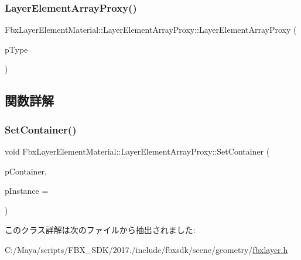 \subsubsection{\texorpdfstring{Layer\+Element\+Array\+Proxy()}{LayerElementArrayProxy()}}
{\footnotesize\ttfamily Fbx\+Layer\+Element\+Material\+::\+Layer\+Element\+Array\+Proxy\+::\+Layer\+Element\+Array\+Proxy (\begin{DoxyParamCaption}\item[{\hyperlink{fbxpropertytypes_8h_a73913a5ddfb20e57c6f25e9e6784bd92}{E\+Fbx\+Type}}]{p\+Type }\end{DoxyParamCaption})}



\subsection{関数詳解}
\mbox{\label{class_fbx_layer_element_material_1_1_layer_element_array_proxy_a8772c8cf8d76dbdcb5d4019ef29d6af0}} 
\subsubsection{\texorpdfstring{Set\+Container()}{SetContainer()}}
{\footnotesize\ttfamily void Fbx\+Layer\+Element\+Material\+::\+Layer\+Element\+Array\+Proxy\+::\+Set\+Container (\begin{DoxyParamCaption}\item[{\hyperlink{class_fbx_layer_container}{Fbx\+Layer\+Container} $\ast$}]{p\+Container,  }\item[{int}]{p\+Instance = {} }\end{DoxyParamCaption})}



このクラス詳解は次のファイルから抽出されました\+:\begin{DoxyCompactItemize}
\item 
C\+:/\+Maya/scripts/\+F\+B\+X\+\_\+\+S\+D\+K/2017./include/fbxsdk/scene/geometry/\hyperlink{fbxlayer_8h}{fbxlayer.\+h}\end{DoxyCompactItemize}
